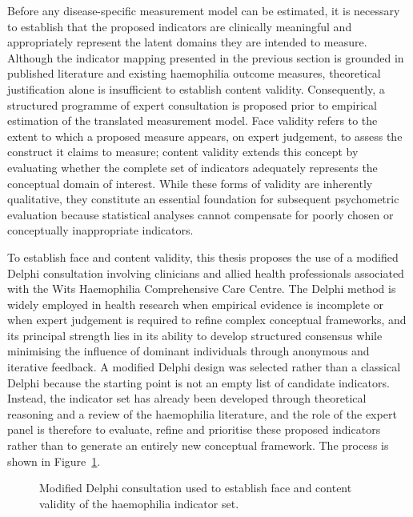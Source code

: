\noindent Before any disease-specific measurement model can be estimated, it is necessary to establish that the proposed indicators are clinically meaningful and appropriately represent the latent domains they are intended to measure. Although the indicator mapping presented in the previous section is grounded in published literature and existing haemophilia outcome measures, theoretical justification alone is insufficient to establish content validity. Consequently, a structured programme of expert consultation is proposed prior to empirical estimation of the translated measurement model. Face validity refers to the extent to which a proposed measure appears, on expert judgement, to assess the construct it claims to measure; content validity extends this concept by evaluating whether the complete set of indicators adequately represents the conceptual domain of interest. While these forms of validity are inherently qualitative, they constitute an essential foundation for subsequent psychometric evaluation because statistical analyses cannot compensate for poorly chosen or conceptually inappropriate indicators.

To establish face and content validity, this thesis proposes the use of a modified Delphi consultation involving clinicians and allied health professionals associated with the Wits Haemophilia Comprehensive Care Centre. The Delphi method is widely employed in health research when empirical evidence is incomplete or when expert judgement is required to refine complex conceptual frameworks, and its principal strength lies in its ability to develop structured consensus while minimising the influence of dominant individuals through anonymous and iterative feedback. A modified Delphi design was selected rather than a classical Delphi because the starting point is not an empty list of candidate indicators. Instead, the indicator set has already been developed through theoretical reasoning and a review of the haemophilia literature, and the role of the expert panel is therefore to evaluate, refine and prioritise these proposed indicators rather than to generate an entirely new conceptual framework. The process is shown in Figure~\ref{fig:delphi}.

\begin{figure}[htbp]
\centering

\captionsetup{justification=justified, width=\linewidth}
\caption{Modified Delphi consultation used to establish face and content validity of the haemophilia indicator set.}
\label{fig:delphi}
\end{figure}

